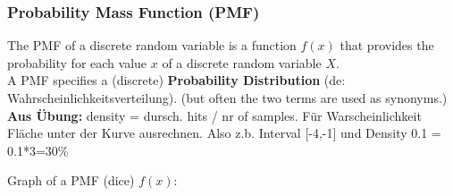 \subsubsection{Probability Mass Function (PMF)}
\begin{minipage}{0.6 \linewidth}
The PMF of a discrete random variable is a function $f(x)$ that provides the probability for each value $x$ of a discrete random variable $X$.\\
A PMF specifies a (discrete) \textbf{Probability Distribution} (de: Wahrscheinlichkeitsverteilung). (but often the two terms are used as synonyms.)\\
\textbf{Aus Übung:} density = dursch. hits / nr of samples. Für Warscheinlichkeit Fläche unter der Kurve ausrechnen. Also z.b. Interval [-4,-1] und Density 0.1 = 0.1*3=30\%
\end{minipage}
\begin{minipage}{0.4 \linewidth}
\centering
Graph of a PMF (dice) $f(x)$:\\
\end{minipage}